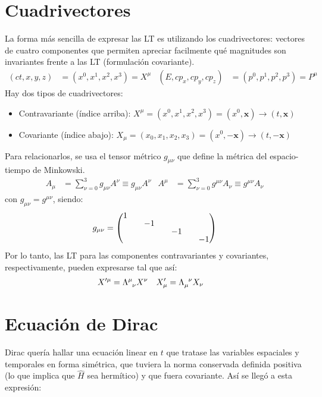 \section{Cuadrivectores}\label{cap:four-vectors}
La forma más sencilla de expresar las LT es utilizando los cuadrivectores: vectores de cuatro componentes que permiten apreciar facilmente qué magnitudes son invariantes frente a las LT (formulación covariante).
\begin{align}
(ct,x, y, z) &=(x^0, x^1, x^2, x^3)=X^\mu & (E,cp_x, cp_y, cp_z) &=(p^0, p^1, p^2, p^3)=P^\mu
\end{align}
Hay dos tipos de cuadrivectores:
\begin{itemize}
\item Contravariante (índice arriba): $X^\mu=(x^0, x^1, x^2, x^3)=(x^0,\textbf{x}) \rightarrow (t,\textbf{x})$
\item Covariante (índice abajo): $X_\mu=(x_0, x_1, x_2, x_3)=(x^0,-\textbf{x}) \rightarrow (t,-\textbf{x})$
\end{itemize} 
Para relacionarlos, se usa el tensor métrico $g_{\mu\nu}$ que define la métrica del espacio-tiempo de Minkowski.
\begin{align}
A_{\mu } &=\sum ^{3}_{\nu =0}g_{\mu \nu }A^{\nu} \equiv g_{\mu \nu }A^{\nu} & A^{\mu } &=\sum ^{3}_{\nu =0}g^{\mu \nu }A_{\nu} \equiv g^{\mu \nu }A_{\nu}
\end{align}
con $g_{\mu\nu} = g^{\mu\nu}$, siendo:
\begin{equation*}
g_{\mu\nu} = 
\begingroup 
\renewcommand*{\arraystretch}{0.8}
\setlength\arraycolsep{10pt}
\begin{pmatrix}
1 & & &  \\
& -1 & & \\
& & -1 & \\
& & & -1
\end{pmatrix}
\endgroup
\end{equation*}
Por lo tanto, las LT para las componentes contravariantes y covariantes, respectivamente, pueden expresarse tal que así:
\begin{align}
X'^{\mu } &=\Lambda\indices{^\mu _\nu}X^\nu & X'_{\mu } &=\Lambda\indices{_\mu ^\nu}X_\nu
\end{align}

\section{Ecuación de Dirac}\label{cap:Dirac}
Dirac quería hallar una ecuación linear en $t$ que tratase las variables espaciales y temporales en forma simétrica, que tuviera la norma conservada definida positiva (lo que implica que $\widehat{H}$ sea hermítico) y que fuera covariante.\cite{MCR} Así se llegó a esta expresión:

